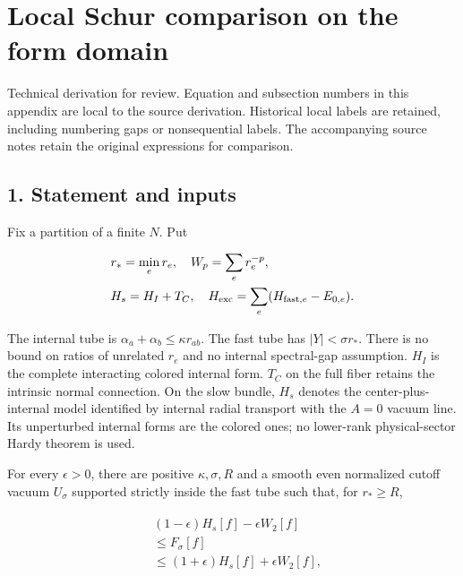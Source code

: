 \clearpage
\section{Local Schur comparison on the form
domain}\label{i-local-schur-comparison-on-the-form-domain}

Technical derivation for review. Equation and subsection numbers in this
appendix are local to the source derivation. Historical local labels are
retained, including numbering gaps or nonsequential labels. The
accompanying source notes retain the original expressions for
comparison.

\subsection{1. Statement and inputs}\label{i-statement-and-inputs}

Fix a partition of a finite \(N\). Put

\begin{gather*}
\begin{aligned}
& r_{*} = \min _{e} r_{e}, \quad  W_{p} = \sum _{e} r_{e}^{-p}, \\
& H_{s} = H_{I} + T_{C}, \quad  H_{\mathrm{exc}} = \sum _{e}(H_{\mathrm{fast},e}-E_{0,e}).
\end{aligned}\notag
\end{gather*}

The internal tube is \(\alpha _{a}+\alpha _{b} \le  \kappa  r_{ab}\).
The fast tube has \(\vert Y\vert  < \sigma  r_{*}\). There is no bound
on ratios of unrelated \(r_{e}\) and no internal spectral-gap
assumption. \(H_{I}\) is the complete interacting colored internal form.
\(T_{C}\) on the full fiber retains the intrinsic normal connection. On
the slow bundle, \(H_{s}\) denotes the center-plus-internal model
identified by internal radial transport with the \(A=0\) vacuum line.
Its unperturbed internal forms are the colored ones; no lower-rank
physical-sector Hardy theorem is used.

For every \(\epsilon >0\), there are positive \(\kappa , \sigma , R\)
and a smooth even normalized cutoff vacuum \(U_{\sigma}\) supported
strictly inside the fast tube such that, for \(r_{*}\ge R\),

\begin{gather*}
\begin{aligned}
& (1-\epsilon ) H_{s}[f] - \epsilon  W_{2}[f] \\
& \le  F_{\sigma}[f] \\
& \le  (1+\epsilon ) H_{s}[f] + \epsilon  W_{2}[f],
\end{aligned}\tag{1.1}
\end{gather*}

